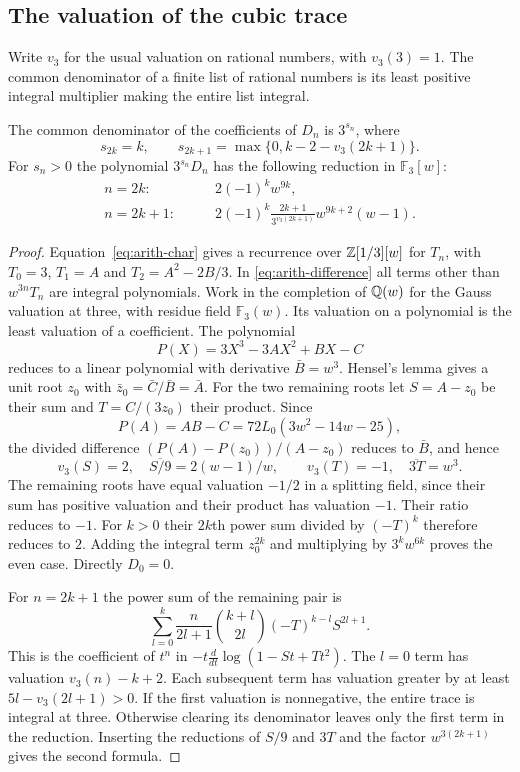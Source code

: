 \subsection{The valuation of the cubic trace}

Write $v_3$ for the usual valuation on rational numbers, with
$v_3(3)=1$. The common denominator of a finite list of rational
numbers is its least positive integral multiplier making the entire
list integral.

\begin{theorem}\label{thm:arith-rows}
The common denominator of the coefficients of $D_n$ is $3^{s_n}$,
where
\[
 s_{2k}=k,\qquad s_{2k+1}=\max\{0,k-2-v_3(2k+1)\}.
\]
For $s_n>0$ the polynomial $3^{s_n}D_n$ has the following reduction
in $\mathbb F_3[w]$:
\begin{align*}
 n=2k:&\qquad 2(-1)^kw^{9k},\\
 n=2k+1:&\qquad
 2(-1)^k\frac{2k+1}{3^{v_3(2k+1)}}w^{9k+2}(w-1).
\end{align*}
\end{theorem}
\begin{proof}
Equation~\eqref{eq:arith-char} gives a recurrence over
$\mathbb Z[1/3][w]$ for $T_n$, with $T_0=3$, $T_1=A$ and
$T_2=A^2-2B/3$. In \eqref{eq:arith-difference} all terms other than
$w^{3n}T_n$ are integral polynomials. Work in the completion of
$\mathbb Q(w)$ for the Gauss valuation at three, with residue field
$\mathbb F_3(w)$. Its valuation on a polynomial is the least valuation
of a coefficient. The polynomial
\[
 P(X)=3X^3-3AX^2+BX-C
\]
reduces to a linear polynomial with derivative $\bar B=w^3$.
Hensel's lemma gives a unit root $z_0$ with
$\bar z_0=\bar C/\bar B=\bar A$. For the two remaining roots let
$S=A-z_0$ be their sum and $T=C/(3z_0)$ their product. Since
\[
 P(A)=AB-C=72L_0(3w^2-14w-25),
\]
the divided difference $(P(A)-P(z_0))/(A-z_0)$ reduces to $\bar B$,
and hence
\[
 v_3(S)=2,\quad \overline{S/9}=2(w-1)/w,\qquad
 v_3(T)=-1,\quad \overline{3T}=w^3.
\]
The remaining roots have equal valuation $-1/2$ in a splitting
field, since their sum has positive valuation and their product
has valuation $-1$. Their ratio reduces to $-1$. For $k>0$ their
$2k$th power sum divided by $(-T)^k$ therefore reduces to $2$.
Adding the integral term $z_0^{2k}$ and multiplying by
$3^kw^{6k}$ proves the even case. Directly $D_0=0$.

For $n=2k+1$ the power sum of the remaining pair is
\[
 \sum_{l=0}^k\frac{n}{2l+1}\binom{k+l}{2l}(-T)^{k-l}S^{2l+1}.
\]
This is the coefficient of $t^n$ in
$-t\frac{d}{dt}\log(1-St+Tt^2)$. The $l=0$ term has valuation
$v_3(n)-k+2$. Each subsequent term has valuation greater by at least
$5l-v_3(2l+1)>0$. If the first valuation is nonnegative, the entire
trace is integral at three. Otherwise clearing its denominator leaves
only the first term in the reduction. Inserting the reductions of
$S/9$ and $3T$ and the factor $w^{3(2k+1)}$ gives the second formula.
\end{proof}


